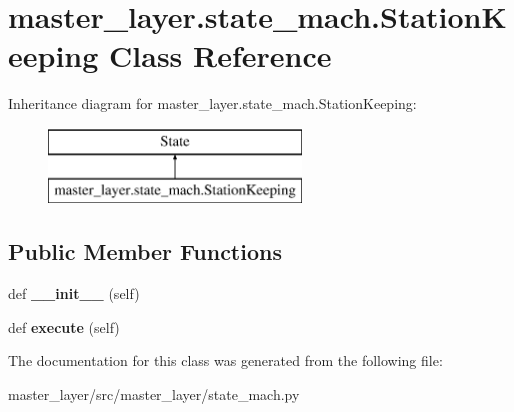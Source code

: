 \hypertarget{classmaster__layer_1_1state__mach_1_1StationKeeping}{}\section{master\+\_\+layer.\+state\+\_\+mach.\+Station\+Keeping Class Reference}
\label{classmaster__layer_1_1state__mach_1_1StationKeeping}
Inheritance diagram for master\+\_\+layer.\+state\+\_\+mach.\+Station\+Keeping\+:\begin{figure}[H]
\begin{center}
\leavevmode
\includegraphics[height=2.000000cm]{classmaster__layer_1_1state__mach_1_1StationKeeping}
\end{center}
\end{figure}
\subsection*{Public Member Functions}
\begin{DoxyCompactItemize}
\item 
\mbox{\label{classmaster__layer_1_1state__mach_1_1StationKeeping_a5cd0c1f2b0e554376217ab28aaf79b49}} 
def {\bfseries \+\_\+\+\_\+init\+\_\+\+\_\+} (self)
\item 
\mbox{\label{classmaster__layer_1_1state__mach_1_1StationKeeping_a29f624687deacd25bcc7d75a34bbccdd}} 
def {\bfseries execute} (self)
\end{DoxyCompactItemize}


The documentation for this class was generated from the following file\+:\begin{DoxyCompactItemize}
\item 
master\+\_\+layer/src/master\+\_\+layer/state\+\_\+mach.\+py\end{DoxyCompactItemize}
